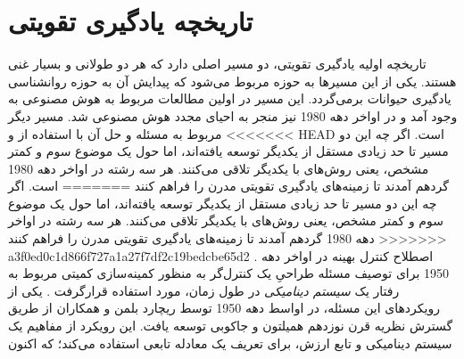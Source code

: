 

\section{تاریخچه یادگیری تقویتی}
تاریخچه اولیه یادگیری تقویتی، دو مسیر اصلی دارد که هر دو طولانی و بسیار غنی هستند. یکی از این مسیرها به حوزه  مربوط می‌شود که پیدایش آن به حوزه روانشناسی یادگیری حیوانات برمی‌گردد. این مسیر در اولین مطالعات مربوط به هوش مصنوعی به وجود آمد و در اواخر دهه 1980 نیز منجر به احیای مجدد هوش مصنوعی شد. مسیر دیگر مربوط به مسئله 
\textit{}
و حل آن با استفاده از
\textit{
}
  و
<<<<<<< HEAD
\textit{}
    است. اگر چه این دو مسیر تا حد زیادی مستقل از یکدیگر توسعه یافته‌اند،  اما حول یک موضوع سوم و کمتر مشخص، یعنی روش‌های 
\textit{} با یکدیگر تلاقی می‌کنند. هر سه رشته در اواخر دهه 1980 گرد‌هم آمدند تا زمینه‌های یادگیری تقویتی مدرن را فراهم کنند
=======
\textit{}
    است. اگر چه این دو مسیر تا حد زیادی مستقل از یکدیگر توسعه یافته‌اند، اما حول یک موضوع سوم و کمتر مشخص، یعنی روش‌های 
\textit{}
  با یکدیگر تلاقی می‌کنند. هر سه رشته در اواخر دهه 1980 گرد‌هم آمدند تا زمینه‌های یادگیری تقویتی مدرن را فراهم کنند
>>>>>>> a3f0ed0c1d866f727a1a27f7df2c19bedcbe65d2
 \cite{suttonbook}.
اصطلاح کنترل بهینه
در اواخر دهه 1950
برای توصیف مسئله طراحیِ یک کنترل‌گر به منظور کمینه‌سازی کمیتی مربوط به رفتار یک \textit{سیستم دینامیکی} در طول زمان، مورد استفاده قرارگرفت
\cite{mldef}.
 یکی از رویکردهای این مسئله، در اواسط دهه 1950 توسط ریچارد بلمن و همکاران از طریق گسترش نظریه قرن نوزدهم همیلتون و جاکوبی
 توسعه یافت. این رویکرد از مفاهیم 
\textit{}
 یک سیستم دینامیکی و تابع ارزش، برای تعریف یک معادله تابعی استفاده می‌کند؛ که اکنون 
